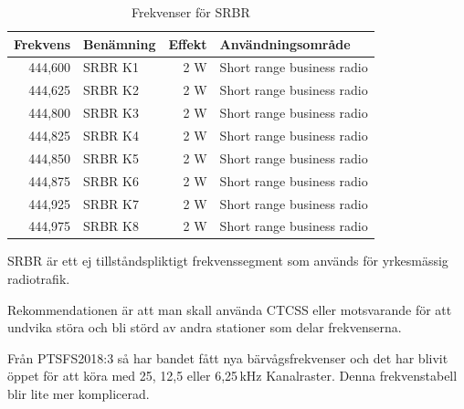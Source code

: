 \begin{table}[h]
	\centering
\begin{tabular}{rlrl}
\textbf{Frekvens} & \textbf{Benämning} & \textbf{Effekt} & \textbf{Användningsområde} \\ \hline
444,600 & SRBR K1            & 2 W             & Short range business radio \\
444,625 & SRBR K2            & 2 W             & Short range business radio \\
444,800 & SRBR K3            & 2 W             & Short range business radio \\
444,825 & SRBR K4            & 2 W             & Short range business radio \\
444,850 & SRBR K5            & 2 W             & Short range business radio \\
444,875 & SRBR K6            & 2 W             & Short range business radio \\
444,925 & SRBR K7            & 2 W             & Short range business radio \\
444,975 & SRBR K8            & 2 W             & Short range business radio
\end{tabular}
\caption{Frekvenser för SRBR}
\end{table}	

SRBR är ett ej tillståndspliktigt frekvenssegment som används för yrkesmässig radiotrafik.

Rekommendationen är att man skall använda CTCSS eller motsvarande för att undvika störa och bli störd av andra stationer som delar frekvenserna.

Från PTSFS2018:3 så har bandet fått nya bärvågsfrekvenser och det har blivit öppet för att köra med 25, 12,5 eller 6,25\,kHz Kanalraster. Denna frekvenstabell blir lite mer komplicerad.

